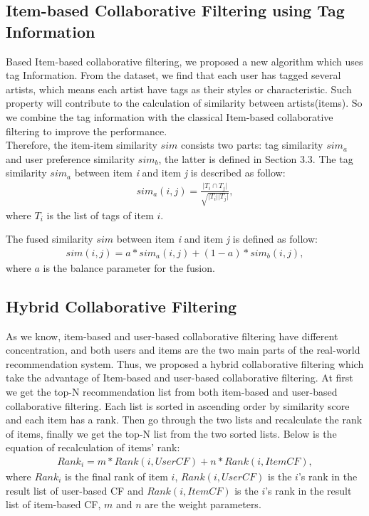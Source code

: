 \documentclass{sig-alternate}
\begin{document}
\subsection{Item-based Collaborative Filtering using Tag Information}
Based Item-based collaborative filtering, we proposed a new algorithm which uses tag Information. From the dataset, we find that each user has tagged several artists, which means each artist have tags as their styles or characteristic. Such property will contribute to the calculation of similarity between artists(items). So we combine the tag information with the classical Item-based collaborative filtering to improve the performance. \\
\indent Therefore, the item-item similarity $sim$ consists two parts: tag similarity $sim_a$ and user preference similarity $sim_b$, the latter is defined in Section 3.3. The tag similarity $sim_a$ between item \textsl{i} and item \textsl{j} is described as follow:
\begin{gather*}
sim_a(i, j)= \frac{\vert T_i  \cap T_j \vert}{\sqrt{\vert T_i \vert \vert T_j \vert}},
\end{gather*}
\indent where $T_i$ is the list of tags of item $i$.

The fused similarity $sim$ between item \textsl{i} and item \textsl{j} is defined as follow:
\begin{gather*}
sim(i, j) = a * sim_a(i, j) + (1-a) * sim_b(i, j),
\end{gather*}
\indent where $a$ is the balance parameter for the fusion.

\subsection{Hybrid Collaborative Filtering}
As we know, item-based and user-based collaborative filtering have different concentration, and both users and items are the two main parts of the real-world recommendation system. Thus, we proposed a hybrid collaborative filtering which take the advantage of Item-based and user-based collaborative filtering. At first we get the top-N recommendation list from both item-based and user-based collaborative filtering. Each list is sorted in ascending order by similarity score and each item has a rank. 
Then go through the two lists and recalculate the rank of items, finally we get the top-N list from the two sorted lists. Below is the equation of recalculation of items' rank:
\begin{gather*}
Rank_i = m * Rank(i, UserCF) + n * Rank(i, ItemCF),
\end{gather*}
\indent where $Rank_i$ is the final rank of item $i$, $Rank(i, UserCF)$ is the $i$'s rank in the result list of user-based CF and $Rank(i, ItemCF)$ is the $i$'s rank in the result list of item-based CF, $m$ and $n$ are the weight parameters.
\end{document}
